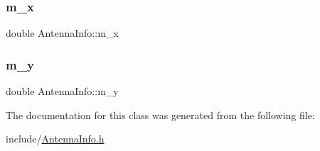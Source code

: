 \subsubsection{\texorpdfstring{m\+\_\+x}{m\_x}}
{\footnotesize\ttfamily double Antenna\+Info\+::m\+\_\+x\hspace{0.3cm}{\ttfamily [private]}}

\mbox{\label{class_antenna_info_a3a9ec27d75b8d2f0d750d64b7a2a3069}} 
\subsubsection{\texorpdfstring{m\+\_\+y}{m\_y}}
{\footnotesize\ttfamily double Antenna\+Info\+::m\+\_\+y\hspace{0.3cm}{\ttfamily [private]}}



The documentation for this class was generated from the following file\+:\begin{DoxyCompactItemize}
\item 
include/\hyperlink{_antenna_info_8h}{Antenna\+Info.\+h}\end{DoxyCompactItemize}
